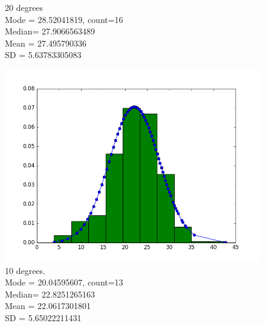 \documentclass[12pt]{article}
\numberwithin{figure}{section}
\numberwithin{table}{section}
\begin{document}
\begin{figure}[H]
\begin{minipage}[b]{0.4\textwidth}
    \caption[Estimation at angle 20 degrees]{20 degrees
    \\\hspace{\textwidth}Mode   = 28.52041819, count=16
	\\\hspace{\textwidth}	Median= 27.9066563489
	\\\hspace{\textwidth}	Mean   = 27.495790336
	\\\hspace{\textwidth}	SD       = 5.63783305083}
  \end{minipage}
\end{figure}
\begin{figure}[H]
  \centering
  \begin{minipage}[b]{0.4\textwidth}
    \includegraphics[width=\textwidth]{angle10.png}
    \caption[Estimation at angle 10 degrees]{10 degrees.
    \\\hspace{\textwidth}Mode   = 20.04595607, count=13
	\\\hspace{\textwidth}	Median= 22.8251265163
	\\\hspace{\textwidth}	Mean   = 22.0617301801
	\\\hspace{\textwidth}	SD       = 5.65022211431}
  \end{minipage}
  \hfill
  \begin{minipage}[b]{0.4\textwidth}

\end{minipage}
\end{figure}
\end{document}

